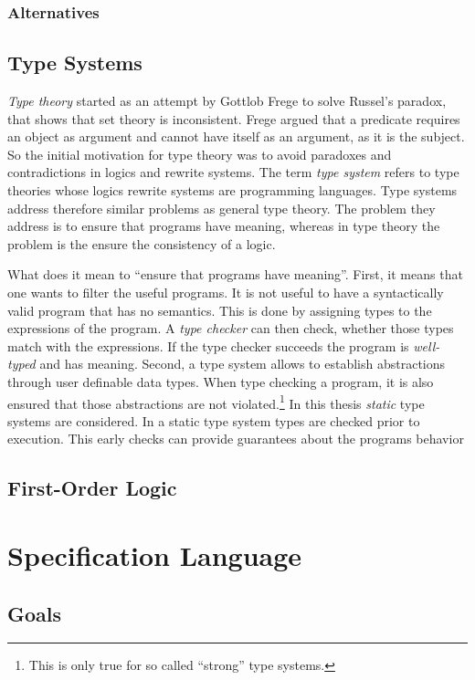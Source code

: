 \documentclass[a4paper,twoside]{report}
\begin{document}
\subsection{Alternatives}
\section{Type Systems}
\textit{Type theory} started as an attempt by Gottlob Frege to solve Russel's
paradox, that shows that \naive set theory is inconsistent. Frege
argued that a predicate requires an object as argument and cannot have
itself as an argument, as it is the subject. So the initial motivation for type theory was to avoid
paradoxes and contradictions in logics and rewrite systems. The term
\textit{type system} refers to type theories whose logics rewrite
systems are programming languages. Type systems address therefore
similar problems as general type theory. The problem they address is
to ensure that programs have meaning, whereas in type theory the
problem is the ensure the consistency of a logic.

What does it mean to ``ensure that programs have meaning''. First, it
means that one wants to filter the useful programs. It is not useful
to have a syntactically valid program that has no semantics. This is
done by assigning types to the expressions of the program. A
\textit{type checker} can then check, whether those types match with
the expressions. If the type checker succeeds the program is
\textit{well-typed} and has meaning. Second, a type system allows to
establish abstractions through user definable data types. When type
checking a program, it is also ensured that those abstractions are not
violated.\footnote{This is only true for so called ``strong'' type
  systems.} In this thesis \textit{static} type systems are
considered. In a static type system types are checked prior to
execution. This early checks can provide guarantees about the programs
behavior 

\section{First-Order Logic}


\chapter{Specification Language}
\section{Goals}
\end{document}
